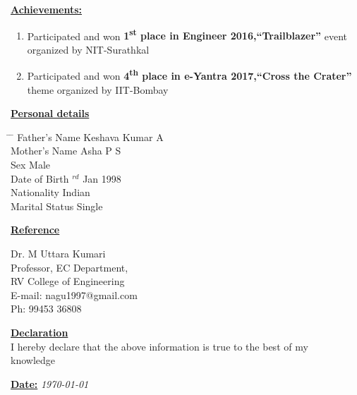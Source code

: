 \documentclass[10pt]{article}
\begin{document}
	\underline{\textbf{\Large{Achievements:}}}
	\begin{enumerate}
		\item{Participated and won \textbf{1\textsuperscript{st}
				place in Engineer 2016,“Trailblazer”} event organized
			by NIT-Surathkal}
		\item{Participated and won \textbf{4\textsuperscript{th}
				place in e-Yantra 2017,“Cross the Crater”} theme
			organized by IIT-Bombay}	
	\end{enumerate}

	\hfill
	
	\underline{\textbf{\Large{Personal details}}}
	
	\parbox{1.5\textwidth}{ %
		\begin{tabbing} %
			\hspace{3cm} \= \hspace{4cm} \= \kill %
			{ Father's Name} \> Keshava Kumar A\\
			{ Mother's Name} \> Asha P S\\
			{ Sex} \> Male\\
			{ Date of Birth} $^{rd}$ Jan 1998  \\ 
			{ Nationality} \> Indian \\
			{ Marital Status} \> Single
	\end{tabbing}}
	\vspace{3cm}
	\hfill	
	
	\underline{\textbf{\Large{Reference}}} 
	\begin{tabbing}
		\hspace{0.5cm}
		Dr. M Uttara Kumari\\
		\hspace{0.5cm}
		Professor, EC Department,\\
		\hspace{0.5cm}
		RV College of Engineering\\
		\hspace{0.5cm}
		{E-mail:}  nagu1997@gmail.com\\
		\hspace{0.5cm}
		Ph: 99453 36808\\
	\end{tabbing}
	
		\underline{\textbf{\Large{Declaration}}} \\
	
	I hereby declare that the above information is true to the best of my \\knowledge
	\\
	\hfill
	
	\underline{\textbf{\large{Date:}}}  {\em\today}
\end{document}
